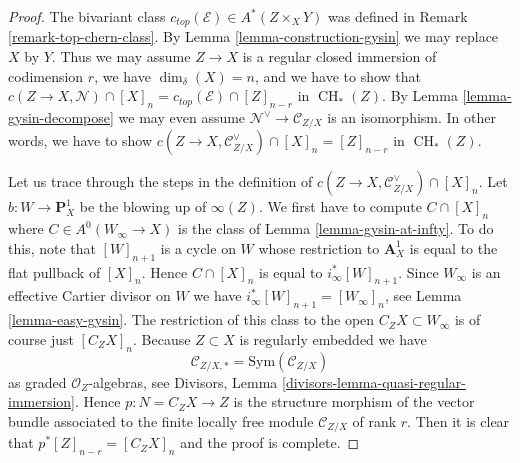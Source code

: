 \documentclass[10pt,a4paper]{amsart}
\theoremstyle{plain}
\theoremstyle{definition}
\theoremstyle{remark}
\numberwithin{equation}{subsection}
\def\CH{\mathop{\mathrm{CH}}\nolimits}
\begin{document}
\begin{proof}
The bivariant class $c_{top}(\mathcal{E}) \in A^*(Z \times_X Y)$ was
defined in Remark \ref{remark-top-chern-class}.
By Lemma \ref{lemma-construction-gysin} we may replace $X$ by $Y$.
Thus we may assume $Z \to X$ is a regular closed immersion
of codimension $r$, we have $\dim_\delta(X) = n$, and we have
to show that $c(Z \to X, \mathcal{N}) \cap [X]_n =
c_{top}(\mathcal{E}) \cap [Z]_{n - r}$ in $\CH_*(Z)$.
By Lemma \ref{lemma-gysin-decompose} we may even assume
$\mathcal{N}^\vee \to \mathcal{C}_{Z/X}$ is an isomorphism.
In other words, we have to show
$c(Z \to X, \mathcal{C}_{Z/X}^\vee) \cap [X]_n = [Z]_{n - r}$ in $\CH_*(Z)$.

\medskip\noindent
Let us trace through the steps in the definition of
$c(Z \to X, \mathcal{C}_{Z/X}^\vee) \cap [X]_n$. Let
$b : W \to \mathbf{P}^1_X$
be the blowing up of $\infty(Z)$. We first have to compute
$C \cap [X]_n$ where $C \in A^0(W_\infty \to X)$ is
the class of Lemma \ref{lemma-gysin-at-infty}.
To do this, note that $[W]_{n + 1}$
is a cycle on $W$ whose restriction to $\mathbf{A}^1_X$ is
equal to the flat pullback of $[X]_n$. Hence $C \cap [X]_n$
is equal to $i_\infty^*[W]_{n + 1}$. Since $W_\infty$ is an
effective Cartier divisor on $W$ we have
$i_\infty^*[W]_{n + 1} = [W_\infty]_n$, see Lemma \ref{lemma-easy-gysin}.
The restriction of this class to the open $C_ZX \subset W_\infty$
is of course just $[C_ZX]_n$. Because $Z \subset X$ is regularly
embedded we have
$$
\mathcal{C}_{Z/X, *} = \text{Sym}(\mathcal{C}_{Z/X})
$$
as graded $\mathcal{O}_Z$-algebras, see
Divisors, Lemma \ref{divisors-lemma-quasi-regular-immersion}.
Hence $p : N = C_ZX \to Z$ is the structure morphism of the
vector bundle associated to the finite locally free module
$\mathcal{C}_{Z/X}$ of rank $r$. Then it is clear that
$p^*[Z]_{n - r} = [C_ZX]_n$ and the proof is complete.
\end{proof}
\end{document}

